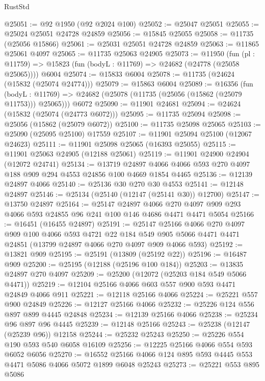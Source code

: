 \begin{lexlean}{RustStd}
\begin{coremodule}
@25051 := @92 @1950 (@92 @2024 @100)
@25052 := @25047 @25051
@25055 := @25024 @25051 @24728 @24859
@25056 := @15845 @25055
@25058 := @11735 (@25056 @15866)
@25061 := @25031 @25051 @24728 @24859
@25063 := @11865 @25061 @4097
@25065 := @11735 @25063 @24905
@25073 := @11950
    (fun (pl : @11759) => @15823 (fun (bodyL : @11769) => @24682 (@24778 (@25058 @25065))))
    @6004
@25074 := @15833 @6004
@25078 := @11735 (@24624 (@15832 (@25074 @24774)))
@25079 := @15863 @6004
@25089 := @16356
    (fun (bodyL : @11769) => @24682 (@25078 (@11735 (@25056 (@15862 (@25079 @11753))) @25065)))
    @6072
@25090 := @11901 @24681
@25094 := @24624 (@15832 (@25074 (@24773 @6072)))
@25095 := @11735 @25094
@25098 := @25056 (@15862 (@25079 @6072))
@25100 := @11735 @25098 @25065
@25103 := @25090 (@25095 @25100) @17559
@25107 := @11901 @25094 @25100 (@12067 @24623)
@25111 := @11901 @25098 @25065 (@16393 @25055)
@25115 := @11901 @25063 @24905 (@12188 @25061)
@25119 := @11901 @24900 @24904 (@12072 @24741)
@25134 := @13719
    @24897
    @4066
    @4066
    @593
    @270
    @4097
    @188
    @909
    @294
    @4553
    @24856
    @100
    @4669
    @1854
    @4465
@25136 := @12139 @24897 @4066
@25140 := @25136 @30 @270 @30 @4553
@25141 := @12148 @24897
@25146 := @25134 (@25140 (@12147 (@25141 @30)) @12700)
@25147 := @13750 @24897
@25164 := @25147
    @24897
    @4066
    @270
    @4097
    @909
    @293
    @4066
    @593
    @24855
    @96
    @241
    @100
    @146
    @4686
    @4471
    @4471
    @5054
@25166 := @16451 (@16455 @24897)
@25191 := @25147
    @25166
    @4066
    @270
    @4097
    @909
    @100
    @4066
    @593
    @4721
    @22
    @184
    @549
    @905
    @5066
    @4471
    @4471
    @24851
    (@13799 @24897 @4066 @270 @4097 @909 @4066 @593)
@25192 := @13821 @909
@25195 := @25191 (@13809 (@25192 @22))
@25196 := @16487 @909
@25200 := @25195 (@12188 (@25196 @100 @184))
@25203 := @13835 @24897 @270 @4097
@25209 := @25200 (@12072 (@25203 @184 @549 @5066 @4471))
@25219 := @12104 @25166 @4066 @603 @557 @900 @593 @4471 @24849 @4066 @911
@25221 := @12118 @25166 @4066
@25224 := @25221 @557 @900 @24849
@25226 := @12127 @25166 @4066
@25232 := @25226 @124 @556 @897 @899 @4445 @24848
@25234 := @12139 @25166 @4066
@25238 := @25234 @96 @897 @96 @4445
@25239 := @12148 @25166
@25243 := @25238 (@12147 (@25239 @96)) @12158
@25244 := @25232 @25243
@25250 := @25226 @554 @190 @593 @540 @6058 @16109
@25256 := @12225 @25166 @4066 @554 @593 @6052 @6056
@25270 := @16552 @25166 @4066 @124 @895 @593 @4445 @553 @4471 @5086 @4066 @5072 @1899 @6048 @25243
@25273 := @25221 @553 @895 @5086

\end{coremodule}
\end{lexlean}
